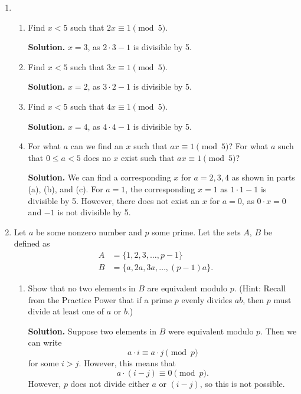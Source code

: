 \documentclass[11pt]{article}
\theoremstyle{definition}
\begin{document}
\begin{enumerate} \addtocounter{enumi}{\value{problem_count}}

\item \addtocounter{problem_count}{1}
\begin{enumerate}
\item Find $x < 5$ such that $2x \equiv 1 \pmod 5$.

\textbf{Solution.}
$x = 3$, as $2 \cdot 3 - 1$ is divisible by 5.

\item Find $x < 5$ such that $3x \equiv 1 \pmod 5$.

\textbf{Solution.}
$x = 2$, as $3 \cdot 2 - 1$ is divisible by 5.

\item Find $x < 5$ such that $4x \equiv 1 \pmod 5$.

\textbf{Solution.}
$x = 4$, as $4 \cdot 4 - 1$ is divisible by 5.

\item For what $a$ can we find an $x$ such that $ax \equiv 1 \pmod{5}$? For what $a$ such that $0 \le a < 5$ does no $x$ exist such that $ax \equiv 1 \pmod{5}$?

\textbf{Solution.}
We can find a corresponding $x$ for $a=2,3,4$ as shown in parts (a), (b), and (c). For $a = 1$, the corresponding $x = 1$ as $1 \cdot 1 - 1$ is divisible by 5. However, there does not exist an $x$ for $a = 0$, as $0 \cdot x = 0$ and $-1$ is not divisible by 5.

\end{enumerate}

\item \addtocounter{problem_count}{1}
Let $a$ be some nonzero number and $p$ some prime. Let the sets $A$, $B$ be defined as
\begin{align*}
A &= \{1, 2, 3,\ldots, p-1\} \\
B &= \{a, 2a, 3a, \ldots, (p-1)a\}.
\end{align*}
\begin{enumerate}
\item Show that no two elements in $B$ are equivalent modulo $p$. (Hint: Recall from the Practice Power that if a prime $p$ evenly divides $ab$, then $p$ must divide at least one of $a$ or $b$.)

\textbf{Solution.}
Suppose two elements in $B$ were equivalent modulo $p$. Then we can write
\[a \cdot i \equiv a \cdot j \pmod{p}\]
for some $i > j$. However, this means that
\[a \cdot (i - j) \equiv 0 \pmod{p}.\]
However, $p$ does not divide either $a$ or $(i - j)$, so this is not possible.


\end{enumerate}
\end{enumerate}
\end{document}
